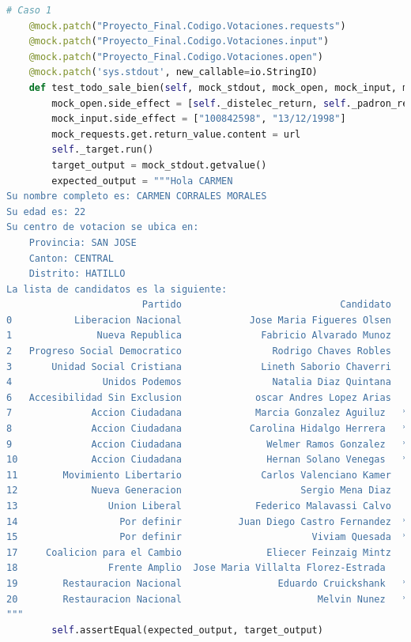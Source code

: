 \documentclass[conference]{IEEEtran}
\begin{document}
\begin{lstlisting}[language=Python, basicstyle=\tiny, breaklines=true,
    postbreak=\mbox{\textcolor{red}{$\hookrightarrow$}\space}]
    # Caso 1
    @mock.patch("Proyecto_Final.Codigo.Votaciones.requests")
    @mock.patch("Proyecto_Final.Codigo.Votaciones.input")
    @mock.patch("Proyecto_Final.Codigo.Votaciones.open")
    @mock.patch('sys.stdout', new_callable=io.StringIO)
    def test_todo_sale_bien(self, mock_stdout, mock_open, mock_input, mock_requests):
        mock_open.side_effect = [self._distelec_return, self._padron_return]
        mock_input.side_effect = ["100842598", "13/12/1998"]
        mock_requests.get.return_value.content = url
        self._target.run()
        target_output = mock_stdout.getvalue()
        expected_output = """Hola CARMEN
Su nombre completo es: CARMEN CORRALES MORALES
Su edad es: 22
Su centro de votacion se ubica en:
	Provincia: SAN JOSE
	Canton: CENTRAL
	Distrito: HATILLO
La lista de candidatos es la siguiente:
                        Partido                            Candidato    Tipo de candidato
0           Liberacion Nacional            Jose Maria Figueres Olsen    Candidato Oficial
1               Nueva Republica              Fabricio Alvarado Munoz    Candidato Oficial
2   Progreso Social Democratico                Rodrigo Chaves Robles    Candidato Oficial
3       Unidad Social Cristiana              Lineth Saborio Chaverri    Candidato Oficial
4                Unidos Podemos                Natalia Diaz Quintana    Candidato Oficial
6   Accesibilidad Sin Exclusion             oscar Andres Lopez Arias    Candidato Oficial
7              Accion Ciudadana             Marcia Gonzalez Aguiluz   **Posible Candidato
8              Accion Ciudadana            Carolina Hidalgo Herrera   **Posible Candidato
9              Accion Ciudadana               Welmer Ramos Gonzalez   **Posible Candidato
10             Accion Ciudadana               Hernan Solano Venegas   **Posible Candidato
11        Movimiento Libertario              Carlos Valenciano Kamer    Candidato Oficial
12             Nueva Generacion                     Sergio Mena Diaz    Candidato Oficial
13                Union Liberal             Federico Malavassi Calvo    Candidato Oficial
14                  Por definir          Juan Diego Castro Fernandez  **Posible Candidato
15                  Por definir                       Viviam Quesada  **Posible Candidato
17     Coalicion para el Cambio               Eliecer Feinzaig Mintz    Candidato Oficial
18                Frente Amplio  Jose Maria Villalta Florez-Estrada     Candidato Oficial
19        Restauracion Nacional                 Eduardo Cruickshank   **Posible Candidato
20        Restauracion Nacional                        Melvin Nunez   **Posible Candidato
"""
        self.assertEqual(expected_output, target_output)


\end{lstlisting}
\end{document}
